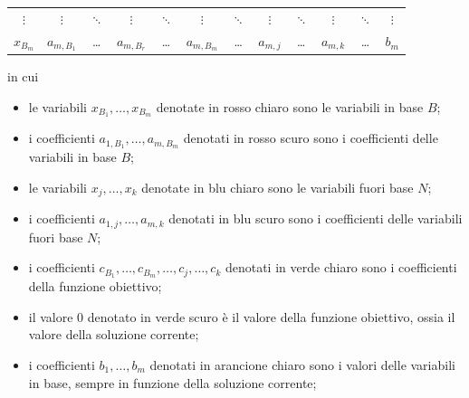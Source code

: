 \documentclass[a4paper]{extarticle}
\begin{document}
\begin{table}[H]
\begin{tabular}{|c|ccccc|ccccc|c|}
        \cellcolor{red!25!white}$\vdots$ & \cellcolor{red!50!white}$\vdots$ & \cellcolor{red!50!white}$\ddots$ & \cellcolor{red!50!white}$\vdots$ & \cellcolor{red!50!white}$\ddots$ & \cellcolor{red!50!white}$\vdots$ & \cellcolor{blue!50!white}$\ddots$ & \cellcolor{blue!50!white}$\vdots$ & \cellcolor{blue!50!white}$\ddots$ & \cellcolor{blue!50!white}$\vdots$ & \cellcolor{blue!50!white}$\ddots$ & \cellcolor{orange!25!white}$\vdots$\\
        \cellcolor{red!25!white}$x_{B_m}$ & \cellcolor{red!50!white}$a_{m,B_1}$ & \cellcolor{red!50!white}\dots & \cellcolor{red!50!white}$a_{m,B_r}$ & \cellcolor{red!50!white}\dots & \cellcolor{red!50!white}$a_{m,B_m}$ & \cellcolor{blue!50!white}\dots & \cellcolor{blue!50!white}$a_{m,j}$ & \cellcolor{blue!50!white}\dots & \cellcolor{blue!50!white}$a_{m,k}$ & \cellcolor{blue!50!white}\dots & \cellcolor{orange!25!white}$b_m$\\
        \hline
    \end{tabular}
\end{table}

\vspace{1em}
\noindent
in cui
\begin{itemize}
    \item le variabili $x_{B_1},\dots,x_{B_m}$ denotate in \textcolor{red!25!white}{rosso chiaro} sono le \textcolor{red!25!white}{variabili in base $B$};
    \item i coefficienti $a_{1,B_1},\dots,a_{m,B_m}$ denotati in \textcolor{red!50!white}{rosso scuro} sono i \textcolor{red!50!white}{coefficienti delle variabili in base $B$};
    \item le variabili $x_{j},\dots,x_{k}$ denotate in \textcolor{blue!25!white}{blu chiaro} sono le \textcolor{red!25!white}{variabili fuori base $N$};
    \item i coefficienti $a_{1,j},\dots,a_{m,k}$ denotati in \textcolor{blue!50!white}{blu scuro} sono i \textcolor{blue!50!white}{coefficienti delle variabili fuori base $N$};
    \item i coefficienti $c_{B_1},\dots,c_{B_m},\dots,c_j,\dots,c_k$ denotati in \textcolor{green!75!white}{verde chiaro} sono i \textcolor{green!75!white}{coefficienti della funzione obiettivo};
    \item il valore $0$ denotato in \textcolor{green!100!white}{verde scuro} è il \textcolor{green!100!white}{valore della funzione obiettivo}, ossia il valore della soluzione corrente;
    \item i coefficienti $b_{1},\dots,b_m$ denotati in \textcolor{orange!25!white}{arancione chiaro} sono i \textcolor{orange!25!white}{valori delle variabili in base}, sempre in funzione della soluzione corrente;
\end{itemize}
\end{document}
